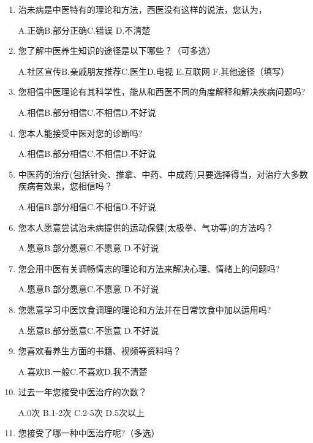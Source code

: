 \begin{enumerate}
A.正确\qquad B.部分正确\qquad C.错误 \qquad D.不清楚

\item 
治未病是中医特有的理论和方法，西医没有这样的说法，您认为，

A.正确\qquad B.部分正确\qquad C.错误 \qquad D.不清楚

\item 您了解中医养生知识的途径是以下哪些？（可多选）

A.社区宣传\qquad B.亲戚朋友推荐\qquad C.医生\qquad D.电视\qquad
E.互联网\qquad
F.其他途径（填写）\underline{\makebox[6em]{}}

\item 
您相信中医理论有其科学性，能从和西医不同的角度解释和解决疾病问题吗?

A.相信\qquad B.部分相信\qquad C.不相信\qquad D.不好说

\item 您本人能接受中医对您的诊断吗?

A.相信\qquad B.部分相信\qquad C.不相信\qquad D.不好说

\item 中医药的治疗(包括针灸、推拿、中药、中成药)只要选择得当，对治疗大多数疾病有效果，您相信吗？

A.相信\qquad B.部分相信\qquad C.不相信\qquad D.不好说


\item 您本人愿意尝试治未病提供的运动保健(太极拳、气功等)的方法吗？

A.愿意\qquad B.部分愿意\qquad C.不愿意 \qquad D.不好说

\item 您会用中医有关调畅情志的理论和方法来解决心理、情绪上的问题吗?

A.愿意\qquad B.部分愿意\qquad C.不愿意 \qquad D.不好说

\item 您愿意学习中医饮食调理的理论和方法并在日常饮食中加以运用吗?

A.愿意\qquad B.部分愿意\qquad C.不愿意 \qquad D.不好说

\item 您喜欢看养生方面的书籍、视频等资料吗？

A.喜欢\qquad B.一般\qquad C.不喜欢\qquad D.我不清楚


\item
过去一年您接受中医治疗的次数？

A.0次 \qquad
B.1-2次\qquad
C.2-5次\qquad
D.5次以上

\item
您接受了哪一种中医治疗呢?（多选）


\end{enumerate}
